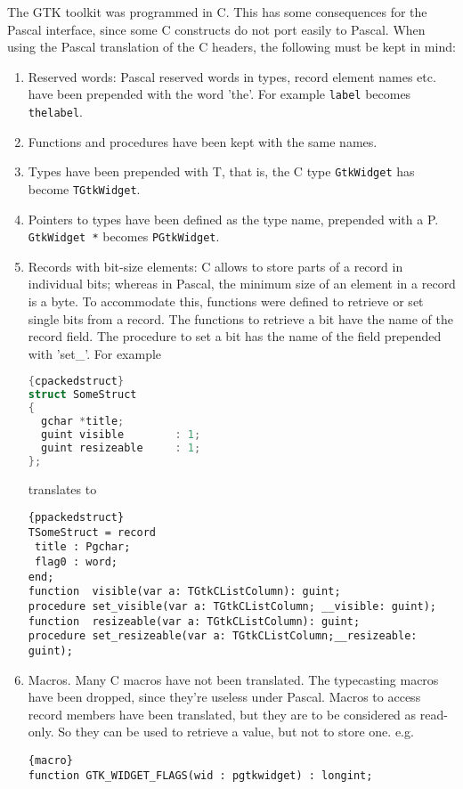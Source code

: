 \documentclass[10pt]{article}
\begin{document}
The GTK toolkit was programmed in C. This has some consequences for the
Pascal interface, since some C constructs do not port easily to Pascal.
When using the Pascal translation of the C headers, the following must be
kept in mind:

\begin{enumerate}
\item Reserved words: Pascal reserved words in types, record element names
etc. have been prepended with the word 'the'. For example \lstinline|label|
becomes \lstinline|thelabel|.
\item Functions and procedures have been kept with the same names. 
\item Types have been prepended with T, that is, the C type
\lstinline|GtkWidget| has become \lstinline|TGtkWidget|.
\item Pointers to types have been defined as the type name, prepended with a
P.  \lstinline|GtkWidget *| becomes \lstinline|PGtkWidget|. 
\item Records with bit-size elements: C allows to store parts of a record in 
individual bits; whereas in Pascal, the minimum size of an element in a
record is a byte. To accommodate this, functions were defined to retrieve
or set single bits from a record. The functions to retrieve a bit
have the name of the record field. The procedure to set a bit has 
the name of the field prepended with 'set\_'.
For example
\begin{lstlisting}[language=c]{cpackedstruct}
struct SomeStruct
{
  gchar *title;
  guint visible        : 1;
  guint resizeable     : 1;
};
\end{lstlisting}
translates to 
\begin{lstlisting}{ppackedstruct}
TSomeStruct = record
 title : Pgchar;
 flag0 : word;
end;
function  visible(var a: TGtkCListColumn): guint;
procedure set_visible(var a: TGtkCListColumn; __visible: guint);
function  resizeable(var a: TGtkCListColumn): guint;
procedure set_resizeable(var a: TGtkCListColumn;__resizeable: guint);
\end{lstlisting}
\item Macros. Many C macros have not been translated. The typecasting 
macros have been dropped, since they're useless under Pascal. 
Macros to access  record members have been translated, but they are to be
considered as {read-only}. So they can be used to retrieve a value, but 
not to store one. e.g. 
\begin{lstlisting}{macro}
function GTK_WIDGET_FLAGS(wid : pgtkwidget) : longint;
\end{lstlisting}

\end{enumerate}
\end{document}
